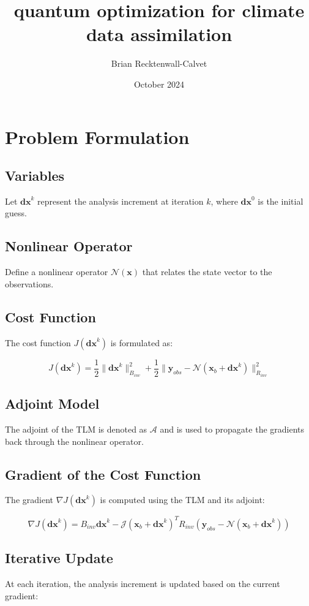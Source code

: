 \documentclass{article}
\title{quantum optimization for climate data assimilation}
\author{Brian Recktenwall-Calvet}
\date{October 2024}
\begin{document}
\maketitle
\section{Problem Formulation}

\subsection{Variables}
Let \( \mathbf{dx}^k \) represent the analysis increment at iteration \( k \), where \( \mathbf{dx}^0 \) is the initial guess.

\subsection{Nonlinear Operator}
Define a nonlinear operator \( \mathcal{N}(\mathbf{x}) \) that relates the state vector to the observations.

\subsection{Cost Function}
The cost function \( J(\mathbf{dx}^k) \) is formulated as:

\[
J(\mathbf{dx}^k) = \frac{1}{2} \|\mathbf{dx}^k\|^2_{B_{inv}} + \frac{1}{2} \|\mathbf{y}_{obs} - \mathcal{N}(\mathbf{x}_b + \mathbf{dx}^k)\|^2_{R_{inv}}
\]

\subsection{Adjoint Model}
The adjoint of the TLM is denoted as \( \mathcal{A} \) and is used to propagate the gradients back through the nonlinear operator.

\subsection{Gradient of the Cost Function}
The gradient \( \nabla J(\mathbf{dx}^k) \) is computed using the TLM and its adjoint:

\[
\nabla J(\mathbf{dx}^k) = B_{inv} \mathbf{dx}^k - \mathcal{J}(\mathbf{x}_b + \mathbf{dx}^k)^T R_{inv} (\mathbf{y}_{obs} - \mathcal{N}(\mathbf{x}_b + \mathbf{dx}^k))
\]

\subsection{Iterative Update}
At each iteration, the analysis increment is updated based on the current gradient:
\end{document}
